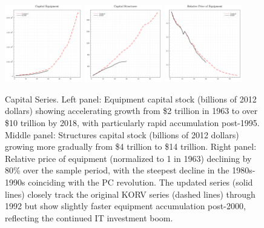 \documentclass[12pt]{article}
\begin{document}
\begin{figure}%
\centering
\includegraphics[width=0.3\textwidth]{../images/capital_equipment_doc.pdf}
\hfill
\includegraphics[width=0.3\textwidth]{../images/capital_structures_doc.pdf}
\hfill
\includegraphics[width=0.3\textwidth]{../images/capital_price_doc.pdf}
\caption{\label{fig:capital_series} Capital Series. Left panel: Equipment capital stock (billions of 2012 dollars) showing accelerating growth from \$2 trillion in 1963 to over \$10 trillion by 2018, with particularly rapid accumulation post-1995. Middle panel: Structures capital stock (billions of 2012 dollars) growing more gradually from \$4 trillion to \$14 trillion. Right panel: Relative price of equipment (normalized to 1 in 1963) declining by 80\% over the sample period, with the steepest decline in the 1980s-1990s coinciding with the PC revolution. The updated series (solid lines) closely track the original KORV series (dashed lines) through 1992 but show slightly faster equipment accumulation post-2000, reflecting the continued IT investment boom.}
\end{figure}
\end{document}

